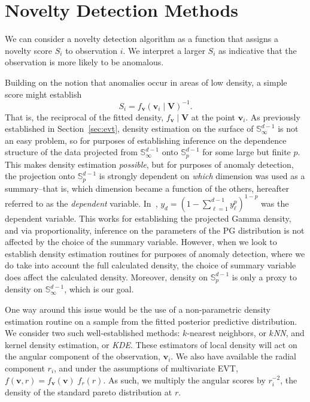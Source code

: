 \section{Novelty Detection Methods\label{sec:novelty}}
We can consider a novelty detection algorithm as a function that assigns a
  novelty score $S_i$ to observation $i$.  We interpret a larger $S_i$
  as indicative that the observation is more likely to be anomalous.

Building on the notion that anomalies occur in areas of low density, a simple
  score might establish
  \[
      S_i = f_{\bm{v}}(\bm{v}_i\mid \bm{V})^{-1}.  
  \]
  That is, the reciprocal of the fitted density, $f_{\bm{v}}\mid \bm{V}$ at the 
  point $\bm{v}_i$.
  As previously established in Section~\ref{sec:evt}, density estimation on the 
  surface of ${\mathbb S}_{\infty}^{d-1}$ is not an easy problem, so for 
  purposes of establishing inference on the dependence structure of the data 
  projected from ${\mathbb S}_{\infty}^{d-1}$ onto ${\mathbb S}_p^{d-1}$ for 
  some large but finite $p$.  This makes density estimation \emph{possible}, but 
  for purposes of anomaly detection, the projection onto ${\mathbb S}_p^{d-1}$ is 
  strongly dependent on \emph{which} dimension was used as a summary--that is, 
  which dimension became a function of the others, hereafter referred to as the 
  \emph{dependent} variable. In~\cite{trubey:pg}, 
  $y_d = (1 - \sum_{\ell = 1}^{d-1}y_{\ell}^p)^{1-p}$ was the dependent variable.
  This works for establishing the projected Gamma density, and via 
  proportionality, inference on the parameters of the PG distribution is not affected
  by the choice of the summary variable. However, when we look to establish 
  density estimation routines for purposes of anomaly detection, where we do 
  take into account the full calculated density, the choice of summary variable 
  does affect the calculated density.  Moreover, density on $\mathbb{S}_p^{d-1}$
  is only a proxy to density on $\mathbb{S}_{\infty}^{d-1}$, which is our goal.


One way around this issue would be the use of a non-parametric density estimation
  routine on a sample from the fitted posterior predictive distribution.  
  We consider two such well-established methods: 
  $k$-nearest neighbors, or \emph{$k$NN}, 
  and kernel density estimation, or \emph{KDE}.
  These estimators of local density will act on the angular component of the observation,
  $\bm{v}_i$.  We also have available the radial component $r_i$, and under the
  assumptions of multivariate EVT, $f(\bm{v},r) = f_{\bm{v}}(\bm{v})\;f_{r}(r)$.  As such,
  we multiply the angular scores by $r_i^{-2}$, the density of the standard pareto
  distribution at $r$.

